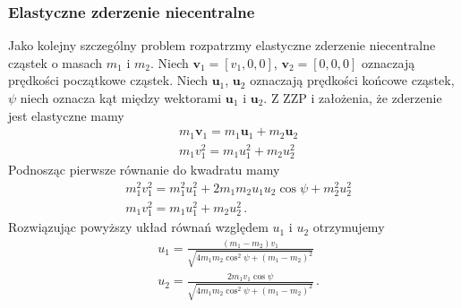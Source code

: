 \documentclass[../main.tex]{subfiles}
\begin{document}
\subsubsection*{Elastyczne zderzenie niecentralne}
Jako kolejny szczególny problem rozpatrzmy elastyczne zderzenie niecentralne cząstek o masach \(m_1\) i \(m_2\). Niech \(\mathbf{v}_1=[v_1,0,0]\), \(\mathbf{v}_2=[0,0,0]\) oznaczają prędkości początkowe cząstek. Niech \(\mathbf{u}_1\), \(\mathbf{u}_2\) oznaczają prędkości końcowe cząstek, \(\psi\) niech oznacza kąt między wektorami \(\mathbf{u}_1\) i \(\mathbf{u}_2\). Z ZZP i założenia, że zderzenie jest elastyczne mamy
\begin{equation*}
\begin{split}
    &m_1\mathbf{v}_1=m_1\mathbf{u}_1+m_2\mathbf{u}_2\\
    &m_1v_1^2=m_1u_1^2+m_2u_2^2
\end{split}
\end{equation*}
Podnosząc pierwsze równanie do kwadratu mamy
\begin{equation*}
\begin{split}
     &m_1^2v_1^2=m_1^2u_1^2+2m_1m_2u_1u_2\cos\psi+m_2^2u_2^2\\
     &m_1v_1^2=m_1u_1^2+m_2u_2^2\,.
\end{split}
\end{equation*}
Rozwiązując powyższy układ równań względem \(u_1\) i \(u_2\) otrzymujemy
\begin{equation*}
\begin{split}
     &u_1=\frac{(m_1-m_2)v_1}{\sqrt{4m_1m_2\cos^2\psi+(m_1-m_2)^2}}\\
     &u_2=\frac{2m_1v_1\cos\psi}{\sqrt{4m_1m_2\cos^2\psi+(m_1-m_2)^2}}\,.
\end{split}
\end{equation*}
\end{document}
